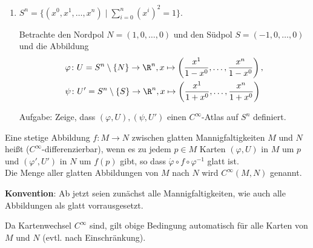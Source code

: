 \begin{bsp}
\begin{enumerate}
  \item $S^n = \{(x^0, x^1, \ldots, x^n) \mid \sum_{i = 0}^n(x^{i})^2 = 1\}$.\\


    Betrachte den Nordpol $N = (1,0,\ldots,0)$ und den Südpol $S = (-1,0,\ldots,0)$ und die Abbildung
    \begin{align*}
      & \varphi \colon U = S^{n}\setminus\{N\} \to \R^n, x \mapsto \left(\frac{x^1}{1-x^0}, \ldots, \frac{x^{n}}{1-x^0}\right),\\
      & \psi \colon U' = S^{n} \setminus \{S\} \to \R^n, x \mapsto \left(\frac{x^1}{1+x^0}, \ldots, \frac{x^n}{1+x^0}\right)
    \end{align*}

    Aufgabe: Zeige, dass $(\varphi, U), (\psi, U')$ einen $C^{\infty}$-Atlas auf $S^n$ definiert.

  \end{enumerate}
\end{bsp}

\begin{dfn}
  

Eine stetige Abbildung $f \colon M \to N$ zwischen glatten Mannigfaltigkeiten $M$ und $N$ heißt  ($C^{\infty}$-differenzierbar), wenn es zu jedem $p \in M$ Karten $(\varphi, U)$ in $M$ um $p$ und $(\varphi', U')$ in $N$ um $f(p)$ gibt, so dass $\acute{\varphi} \circ f\circ\varphi^{-1}$ glatt ist.\\

Die Menge aller glatten Abbildungen von $M$ nach $N$ wird $C^{\infty}(M,N)$ genannt.

\end{dfn}

\textbf{Konvention}: Ab jetzt seien zunächst alle Mannigfaltigkeiten, wie auch alle Abbildungen als glatt vorrausgesetzt.

\begin{bem}
  Da Kartenwechsel $C^{\infty}$ sind, gilt obige Bedingung automatisch für alle Karten von $M$ und $N$ (evtl. nach Einschränkung).
\end{bem}

